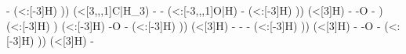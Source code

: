 \begin{struct}
{                                                                        -
                                                                          (<:[-3]H)
                                                                      ))
                                                                        (<[3,,,1]C|H_3)
                                                                      -
                                                                      -
                                                                        (<:[-3,,,1]\textcolor{O}{O}|\textcolor{O}{H})
                                                                      -
                                                                        (<:[-3]H)
                                                                    ))
                                                                      (<[3]H)
                                                                    -
                                                                    -\textcolor{O}{O}
                                                                    -
                                                                  )
                                                                    (<:[-3]H)
                                                                )
                                                                  (<:[-3]H)
                                                                -\textcolor{O}{O}
                                                                -
                                                                  (<:[-3]H)
                                                              ))
                                                                (<[3]H)
                                                              -
                                                              -
                                                              -
                                                                (<:[-3]H)
                                                            ))
                                                              (<[3]H)
                                                            -
                                                            -\textcolor{O}{O}
                                                            -
                                                              (<:[-3]H)
                                                          ))
                                                            (<[3]H)
                                                          -
}
\end{struct}
